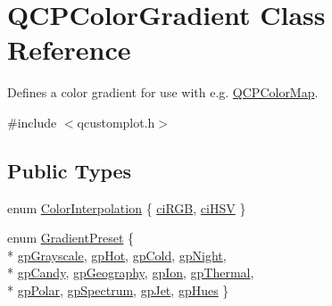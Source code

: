 \hypertarget{classQCPColorGradient}{}\section{Q\+C\+P\+Color\+Gradient Class Reference}
\label{classQCPColorGradient}


Defines a color gradient for use with e.\+g. \hyperlink{classQCPColorMap}{Q\+C\+P\+Color\+Map}.  




{\ttfamily \#include $<$qcustomplot.\+h$>$}

\subsection*{Public Types}
\begin{DoxyCompactItemize}
\item 
enum \hyperlink{classQCPColorGradient_ac5dca17cc24336e6ca176610e7f77fc1}{Color\+Interpolation} \{ \hyperlink{classQCPColorGradient_ac5dca17cc24336e6ca176610e7f77fc1a5e30f725c9cfe93999e268a9f92afbe7}{ci\+R\+GB}, 
\hyperlink{classQCPColorGradient_ac5dca17cc24336e6ca176610e7f77fc1af14ae62fcae11ecc07234eeaec5856cb}{ci\+H\+SV}
 \}
\item 
enum \hyperlink{classQCPColorGradient_aed6569828fee337023670272910c9072}{Gradient\+Preset} \{ \\*
\hyperlink{classQCPColorGradient_aed6569828fee337023670272910c9072add11ae369a86f3b1b6205ec72e5021fb}{gp\+Grayscale}, 
\hyperlink{classQCPColorGradient_aed6569828fee337023670272910c9072a4f42e534cf6cff5a29a5388094d099b5}{gp\+Hot}, 
\hyperlink{classQCPColorGradient_aed6569828fee337023670272910c9072aec8c001f62c0d5cb853db5fd85309557}{gp\+Cold}, 
\hyperlink{classQCPColorGradient_aed6569828fee337023670272910c9072a1bb89351b6def7d220973443fe059c62}{gp\+Night}, 
\\*
\hyperlink{classQCPColorGradient_aed6569828fee337023670272910c9072a9e72663bf6b94b65945f7843f24e0721}{gp\+Candy}, 
\hyperlink{classQCPColorGradient_aed6569828fee337023670272910c9072a382f0b07cec1a59d8a533438aea815d2}{gp\+Geography}, 
\hyperlink{classQCPColorGradient_aed6569828fee337023670272910c9072a4297f4f9e212a819cd65e8e34567182b}{gp\+Ion}, 
\hyperlink{classQCPColorGradient_aed6569828fee337023670272910c9072af1676b129f9f458ace453f280c731cf7}{gp\+Thermal}, 
\\*
\hyperlink{classQCPColorGradient_aed6569828fee337023670272910c9072ab7414ce4e36dc3e82e0132a7f0f41b52}{gp\+Polar}, 
\hyperlink{classQCPColorGradient_aed6569828fee337023670272910c9072ad63adc100ef46f6b4a8a6deacec4642f}{gp\+Spectrum}, 
\hyperlink{classQCPColorGradient_aed6569828fee337023670272910c9072a5f8a9e67b64c17ddfe4f069fe2b9fb02}{gp\+Jet}, 
\hyperlink{classQCPColorGradient_aed6569828fee337023670272910c9072a30efe58407acfb67939032f70213a130}{gp\+Hues}
 \}
\end{DoxyCompactItemize}
